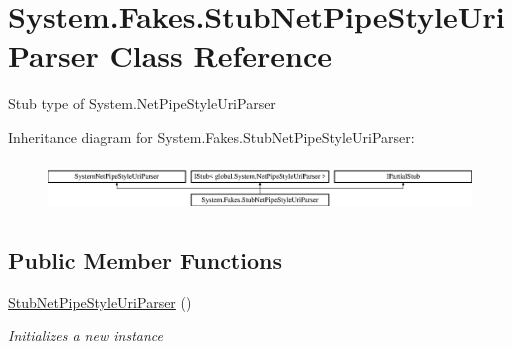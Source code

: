 \hypertarget{class_system_1_1_fakes_1_1_stub_net_pipe_style_uri_parser}{\section{System.\-Fakes.\-Stub\-Net\-Pipe\-Style\-Uri\-Parser Class Reference}
\label{class_system_1_1_fakes_1_1_stub_net_pipe_style_uri_parser}
}


Stub type of System.\-Net\-Pipe\-Style\-Uri\-Parser 


Inheritance diagram for System.\-Fakes.\-Stub\-Net\-Pipe\-Style\-Uri\-Parser\-:\begin{figure}[H]
\begin{center}
\leavevmode
\includegraphics[height=1.333333cm]{class_system_1_1_fakes_1_1_stub_net_pipe_style_uri_parser}
\end{center}
\end{figure}
\subsection*{Public Member Functions}
\begin{DoxyCompactItemize}
\item 
\hyperlink{class_system_1_1_fakes_1_1_stub_net_pipe_style_uri_parser_a10ac54dd9ad97dab10020ac1491c7562}{Stub\-Net\-Pipe\-Style\-Uri\-Parser} ()
\begin{DoxyCompactList}\small\item\em Initializes a new instance\end{DoxyCompactList}\end{DoxyCompactItemize}
